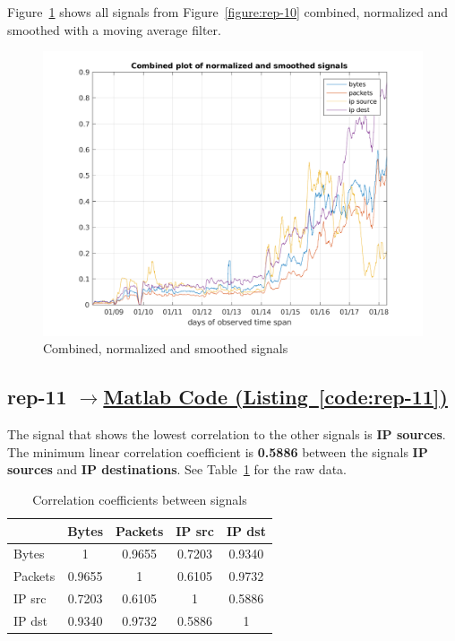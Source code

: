 \documentclass{article}
\newcommand{\codelink}[1]{%
    \hyperref[#1]{\quad$\rightarrow$\enskip Matlab Code (Listing~\ref{#1})}%
}
\begin{document}
Figure~\ref{figure:rep-10-optional} shows all signals from Figure~\ref{figure:rep-10} combined, normalized
and smoothed with a moving average filter.

\begin{figure}[h]
    \centering
    \includegraphics[width=\textwidth]{../exercise-3/plots/rep_10_optional}
    \caption{\label{figure:rep-10-optional} Combined, normalized and smoothed signals}
\end{figure}

\subsection{rep-11 \codelink{code:rep-11}}

The signal that shows the lowest correlation to the other signals is \textbf{IP sources}. The minimum
linear correlation coefficient is \textbf{0.5886} between the signals \textbf{IP sources} and
\textbf{IP destinations}. See Table~\ref{table:rep-11} for the raw data.

\begin{table}[H]
    \centering
    \begin{tabular}{l|c|c|c|c}
                & Bytes  & Packets& IP src    & IP dst    \\
        \hline
        Bytes   & 1      & 0.9655 & 0.7203 & 0.9340 \\
        Packets & 0.9655 & 1      & 0.6105 & 0.9732 \\
        IP src     & 0.7203 & 0.6105 & 1      & 0.5886 \\
        IP dst     & 0.9340 & 0.9732 & 0.5886 & 1      \\
    \end{tabular}
    \caption{\label{table:rep-11} Correlation coefficients between signals}
\end{table}
\end{document}
